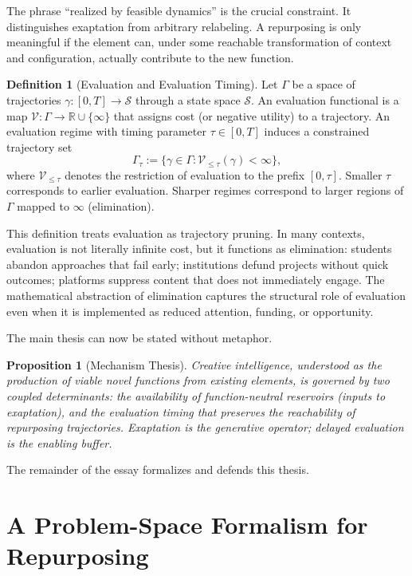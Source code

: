 \documentclass[11pt]{article}
\newtheorem{proposition}{Proposition}
\theoremstyle{definition}
\newtheorem{definition}{Definition}
\begin{document}
The phrase ``realized by feasible dynamics'' is the crucial constraint. It distinguishes exaptation from arbitrary relabeling. A repurposing is only meaningful if the element can, under some reachable transformation of context and configuration, actually contribute to the new function.

\begin{definition}[Evaluation and Evaluation Timing]
Let $\Gamma$ be a space of trajectories $\gamma:[0,T]\to \mathcal{S}$ through a state space $\mathcal{S}$. An evaluation functional is a map $\mathcal{V}:\Gamma\to \mathbb{R}\cup\{\infty\}$ that assigns cost (or negative utility) to a trajectory. An evaluation regime with timing parameter $\tau\in[0,T]$ induces a constrained trajectory set
\[
\Gamma_\tau := \{\gamma\in\Gamma : \mathcal{V}_{\le \tau}(\gamma) < \infty\},
\]
where $\mathcal{V}_{\le \tau}$ denotes the restriction of evaluation to the prefix $[0,\tau]$. Smaller $\tau$ corresponds to earlier evaluation. Sharper regimes correspond to larger regions of $\Gamma$ mapped to $\infty$ (elimination).
\end{definition}

This definition treats evaluation as trajectory pruning. In many contexts, evaluation is not literally infinite cost, but it functions as elimination: students abandon approaches that fail early; institutions defund projects without quick outcomes; platforms suppress content that does not immediately engage. The mathematical abstraction of elimination captures the structural role of evaluation even when it is implemented as reduced attention, funding, or opportunity.

The main thesis can now be stated without metaphor.

\begin{proposition}[Mechanism Thesis]
Creative intelligence, understood as the production of viable novel functions from existing elements, is governed by two coupled determinants: the availability of function-neutral reservoirs (inputs to exaptation), and the evaluation timing that preserves the reachability of repurposing trajectories. Exaptation is the generative operator; delayed evaluation is the enabling buffer.
\end{proposition}

The remainder of the essay formalizes and defends this thesis.

\section{A Problem-Space Formalism for Repurposing}
\end{document}
